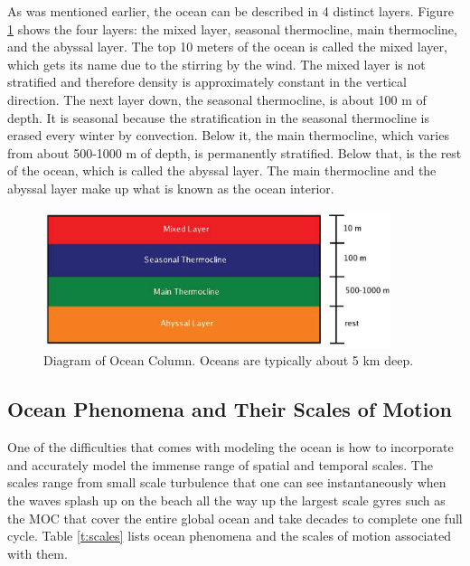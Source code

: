 As was mentioned earlier, the ocean can be described in 4 distinct layers.  Figure \protect \ref{f:OceCol} shows the four layers: the mixed layer, seasonal thermocline, main thermocline, and the abyssal layer.  The top 10 meters of the ocean is called the mixed layer, which gets its name due to the stirring by the wind.  The mixed layer is not stratified and therefore density is approximately constant in the vertical direction.  The next layer down, the seasonal thermocline, is about 100 m of depth.  It is seasonal because the stratification in the seasonal thermocline is erased every winter by convection.  Below it, the main thermocline, which varies from about 500-1000 m of depth, is permanently stratified.  Below that, is the rest of the ocean, which is called the abyssal layer.  The main thermocline and the abyssal layer make up what is known as the ocean interior.

\begin{center}
\begin{figure}[h!]
\centering
  \includegraphics[width=4in]{Images/OceanColumn}
  \caption[Diagram of Ocean Column]{Diagram of Ocean Column.  Oceans are typically about 5 km deep.}\label{f:OceCol}
\end{figure}
\end{center}

\subsection{Ocean Phenomena and Their Scales of Motion}

One of the difficulties that comes with modeling the ocean is how to incorporate and accurately model the immense range of spatial and temporal scales.  The scales range from small scale turbulence that one can see instantaneously when the waves splash up on the beach all the way up the largest scale gyres such as the MOC that cover the entire global ocean and take decades to complete one full cycle.  Table \protect \ref{t:scales} lists ocean phenomena and the scales of motion associated with them.

